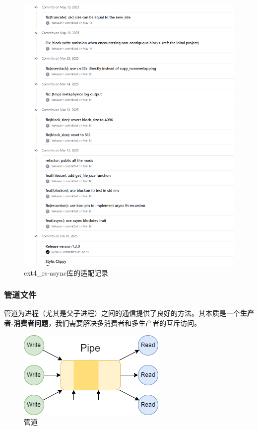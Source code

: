 \documentclass{article}
\begin{document}
\begin{figure}[H]
    \centering
    \includegraphics[width=0.8\linewidth]{assets//fs/image.png}
    \caption{ext4\_rs-async库的适配记录}
\end{figure}

\subsubsection{管道文件}
管道为进程（尤其是父子进程）之间的通信提供了良好的方法。其本质是一个\textbf{生产者-消费者问题}，我们需要解决多消费者和多生产者的互斥访问。

\begin{figure}[H]
    \centering
    \includegraphics[width=0.8\linewidth]{assets//fs/管道pipedrawio.drawio.png}
    \caption{管道}
    \label{管道}
\end{figure}
\end{document}
